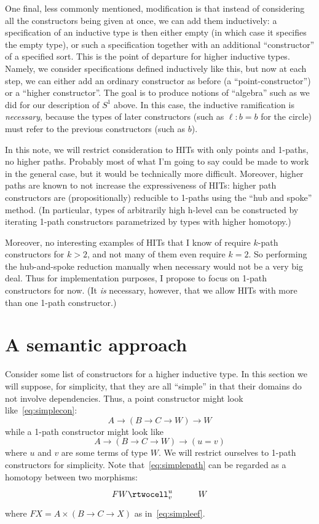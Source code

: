 \documentclass{amsart}
\begin{document}
One final, less commonly mentioned, modification is that instead of considering all the constructors being given at once, we can add them inductively: a specification of an inductive type is then either empty (in which case it specifies the empty type), or such a specification together with an additional ``constructor'' of a specified sort.  This is the point of departure for higher inductive types.  Namely, we consider specifications defined inductively like this, but now at each step, we can either add an ordinary constructor as before (a ``point-constructor'') or a ``higher constructor''.  The goal is to produce notions of ``algebra'' such as we did for our description of $S^1$ above.  In this case, the inductive ramification is \emph{necessary}, because the types of later constructors (such as $\ell:b=b$ for the circle) must refer to the previous constructors (such as $b$).

In this note, we will restrict consideration to HITs with only points and 1-paths, no higher paths.  Probably most of what I'm going to say could be made to work in the general case, but it would be technically more difficult.  Moreover, higher paths are known to not increase the expressiveness of HITs: higher path constructors are (propositionally) reducible to 1-paths using the ``hub and spoke'' method.  (In particular, types of arbitrarily high h-level can be constructed by iterating 1-path constructors parametrized by types with higher homotopy.)

Moreover, no interesting examples of HITs that I know of require $k$-path constructors for $k>2$, and not many of them even require $k=2$.  So performing the hub-and-spoke reduction manually when necessary would not be a very big deal.  Thus for implementation purposes, I propose to focus on 1-path constructors for now.  (It \emph{is} necessary, however, that we allow HITs with more than one 1-path constructor.)



\section{A semantic approach}
\label{sec:semantic}

Consider some list of constructors for a higher inductive type.  In this section we will suppose, for simplicity, that they are all ``simple'' in that their domains do not involve dependencies.  Thus, a point constructor might look like~\eqref{eq:simplecon}:
\begin{equation*}
  A \to (B\to C \to W) \to W
\end{equation*}
while a 1-path constructor might look like
\begin{equation}
  A \to (B\to C \to W) \to (u = v)\label{eq:simplepath}
\end{equation}
where $u$ and $v$ are some terms of type $W$.  We will restrict ourselves to 1-path constructors for simplicity.  Note that~\eqref{eq:simplepath} can be regarded as a homotopy between two morphisms:
\[ \xymatrix{ F W \rtwocell^u_v & W } \]
where $F X = A \times (B\to C\to X)$ as in~\eqref{eq:simpleef}.
\end{document}
